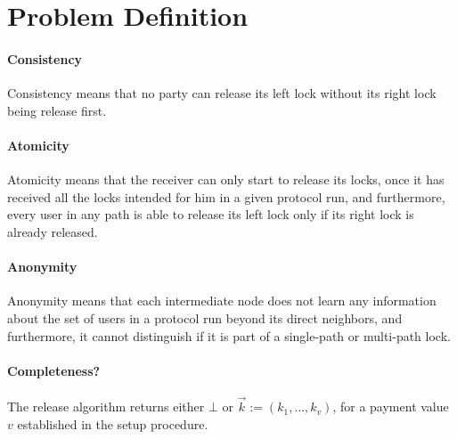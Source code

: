 





\section{Problem Definition}



\paragraph{Consistency} Consistency means that no party can release its left lock without its 
right lock being release first.

\paragraph{Atomicity} Atomicity means that the receiver can only start to release its locks, once it 
has received all the locks intended for him in a given protocol run, and furthermore, every user in 
any path is able to release its left lock only if its right lock is already released. 

\paragraph{Anonymity} Anonymity means that each intermediate node does not learn any information about 
the set of users in a protocol run beyond its direct neighbors, and furthermore, it cannot distinguish 
if it is part of a single-path or multi-path lock.

\paragraph{Completeness?} The release algorithm returns either $\bot$ or $\vec{k} := (k_1,\ldots,
k_v)$, for a payment value $v$ established in the setup procedure.